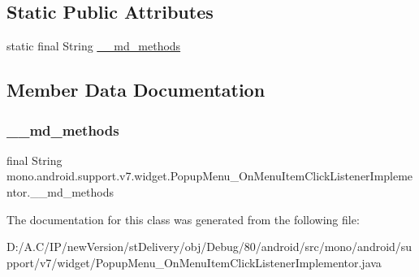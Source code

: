 \subsection*{Static Public Attributes}
\begin{DoxyCompactItemize}
\item 
static final String \hyperlink{classmono_1_1android_1_1support_1_1v7_1_1widget_1_1_popup_menu___on_menu_item_click_listener_implementor_ab113cb5493bf06d8a3e01934bae2ba49}{\+\_\+\+\_\+md\+\_\+methods}
\end{DoxyCompactItemize}


\subsection{Member Data Documentation}
\mbox{\label{classmono_1_1android_1_1support_1_1v7_1_1widget_1_1_popup_menu___on_menu_item_click_listener_implementor_ab113cb5493bf06d8a3e01934bae2ba49}} 
\subsubsection{\texorpdfstring{\+\_\+\+\_\+md\+\_\+methods}{\_\_md\_methods}}
{\footnotesize\ttfamily final String mono.\+android.\+support.\+v7.\+widget.\+Popup\+Menu\+\_\+\+On\+Menu\+Item\+Click\+Listener\+Implementor.\+\_\+\+\_\+md\+\_\+methods\hspace{0.3cm}{\ttfamily [static]}}



The documentation for this class was generated from the following file\+:\begin{DoxyCompactItemize}
\item 
D\+:/\+A.\+C/\+I\+P/new\+Version/st\+Delivery/obj/\+Debug/80/android/src/mono/android/support/v7/widget/Popup\+Menu\+\_\+\+On\+Menu\+Item\+Click\+Listener\+Implementor.\+java\end{DoxyCompactItemize}
